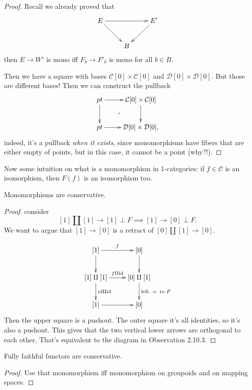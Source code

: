 \begin{proof}
Recall we already proved that
$$
\xymatrix{
E \ar[rd] \ar[rr] && E' \ar[dl] \\
& B
}
$$
then $E \to W'$ is mono iff $F_b \to F'_b$ is mono for all $b \in B$.

Then we have a square with bases $\mathcal{C}[0] \times \mathcal{C}[0]$ 
and $\mathcal{D}[0]\times \mathcal{D}[0]$. But those are different bases!
Then we can construct the pullback
$$
\xymatrix{
pt\ar[r]\ar[d]\ar@{}[dr]|-{\lrcorner}&\mathcal{C}[0]\times\mathcal{C}[0]\ar[d]\\
pt\ar[r]&\mathcal{D}[0]\times\mathcal{D}[0],
}
$$
indeed, it's a pullback {\it when it exists}, since
monomorphisms have fibers that are either empty of points,
but in this case, it cannot be a point (why?!).
\end{proof}

\noindent
Now some intuition on what is a monomorphism in 1-categories:
if $f\in \mathcal{C}$ is an isomorphism, then $F(f)$ is an isomorphism too.

\begin{lemma}
\label{lemma-monomorphisms-are-conservative}
Monomorphisms are conservative.
\end{lemma}

\begin{proof}
consider
$$
[1] \amalg [1] \to [1] \perp F \implies  [1] \to [0] \perp F.
$$
We want to argue that $[1] \to [0]$ is a retract of
$[0] \amalg [1]\to [0]$.

$$
\xymatrix{
[1]\ar[d]\ar[r]^f&[0]\ar[d]\\
[1] \amalg [1]\ar[r]^{f \amalg \text{id}}\ar[d]^{\text{id} \amalg \text{id}}&
[0] \amalg[1]\ar[d]^{\text{left. o. to }F}\\
[1]\ar[r]& [0]
}
$$
Then the upper square is a pushout.
The outer square it's all identities, so it's also a pushout.
This gives that the two vertical lower arrows
are orthogonal to each other.
That's equivalent to the diagram in Observation 2.10.3.
\end{proof}

\begin{lemma}
\label{lemma-fully-faithful-are-conservative}
Fully faithful functors are conservative.
\end{lemma}

\begin{proof}
Use that monomorphism iff monomorphism on groupoids
and on mapping spaces.
\end{proof}

